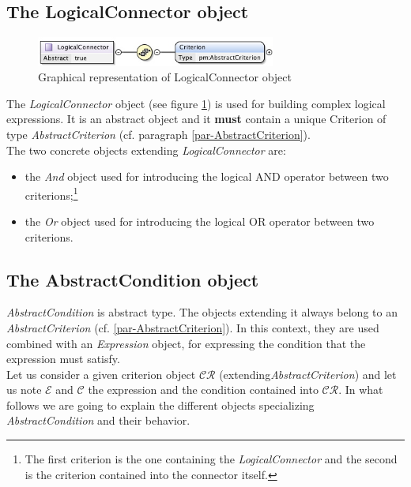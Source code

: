 \documentclass[a4paper,11pt] {article}
\begin{document}
\subsection{The LogicalConnector object}\label{par-LogicalConnector}
\begin{figure}[htbp]
\begin{center}
\includegraphics[width=0.7\textwidth]{pictures/LogicalConnector.jpg} 
\caption{Graphical representation of LogicalConnector object}
\label{Pic-LogicalConnector}
\end{center}
\end{figure}
The {\it LogicalConnector} object (see figure \ref{Pic-LogicalConnector}) is used for building
complex logical expressions. It is an abstract object and it {\bf must} contain a unique Criterion
of type {\it AbstractCriterion} (cf. paragraph \ref{par-AbstractCriterion}).\\
The two concrete objects extending {\it LogicalConnector} are:
\begin{itemize}
\item the {\it And} object used for introducing the logical AND operator between two
criterions;\footnote{The first criterion is the one containing the {\it LogicalConnector} and the
second is the criterion contained into the connector itself.}
\item the {\it Or} object used for introducing the logical OR operator between two criterions.
\end{itemize}

\subsection{The AbstractCondition object}\label{par-ConditionType}
{\it AbstractCondition} is abstract type. The objects extending it always belong to an  {\it 
AbstractCriterion} (cf. \ref{par-AbstractCriterion}). In this context, they are used combined with
an {\it Expression} object, for expressing the condition that the expression must satisfy.\\
Let us consider a given criterion object $\mathcal{CR}$ (extending{\it AbstractCriterion})  and let
us note $\mathcal E$ and $\mathcal C$ the expression and the condition contained into
$\mathcal{CR}$.
In what follows we are going to explain the different objects specializing  {\it AbstractCondition}
and their behavior.
\end{document}
